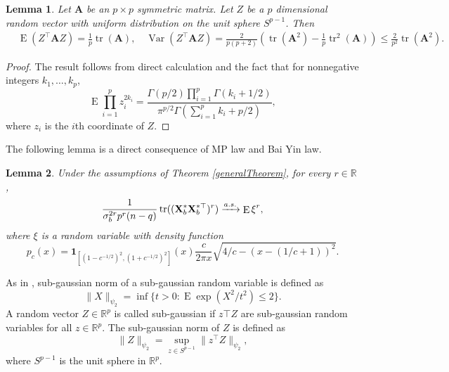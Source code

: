 \documentclass[11pt]{article}
\DeclareMathOperator{\mytr}{tr}
\DeclareMathOperator{\myE}{E}
\DeclareMathOperator{\myVar}{Var}
\newcommand{\BA}{\mathbf{A}}    \newcommand{\BB}{\mathbf{B}}    \newcommand{\BC}{\mathbf{C}}    \newcommand{\BD}{\mathbf{D}}    \newcommand{\BE}{\mathbf{E}}    \newcommand{\BF}{\mathbf{F}}    \newcommand{\BG}{\mathbf{G}}    \newcommand{\BH}{\mathbf{H}}    \newcommand{\BI}{\mathbf{I}}    \newcommand{\BJ}{\mathbf{J}}    \newcommand{\BK}{\mathbf{K}}    \newcommand{\BL}{\mathbf{L}}
\theoremstyle{plain}
\newtheorem{lemma}{\quad\quad Lemma}
\theoremstyle{definition}
\theoremstyle{remark}
\begin{document}
\begin{lemma}\label{lemma:uniform}
    Let $\BA$ be an $p\times p$ symmetric matrix.
    Let $Z$ be a $p$ dimensional random vector with uniform distribution on the unit sphere $ S^{p-1}$.
    Then 
    \begin{equation*}
        \begin{split}
            &\myE (Z^\top \BA Z) = \frac{1}{p} \mytr (\BA),
        \quad
        \myVar (Z^\top \BA Z) =
        \frac{2}{p(p+2)}\left( \mytr (\BA^2) - \frac{1}{p} \mytr^2 (\BA) \right)
        \leq
        \frac{2}{p^2} \mytr (\BA^2)  
        .
        \end{split}
    \end{equation*}
\end{lemma}
\begin{proof}
    The result follows from direct calculation and the fact that for nonnegative integers $k_1,\ldots, k_{p}$,
\begin{equation*}
    \myE \prod_{i=1}^p z_i^{2k_i} 
    =
    \frac{\Gamma(p/2) \prod_{i=1}^p \Gamma(k_i+1/2)}{ \pi^{p/2} \Gamma(\sum_{i=1}^p k_i + p/2)}
    ,
\end{equation*}
where $z_i$ is the $i$th coordinate of $Z$.
\end{proof}

The following lemma is a direct consequence of MP law and Bai Yin law.
\begin{lemma}\label{lemma:MP}
    Under the assumptions of Theorem \ref{generalTheorem}, for every $r\in \mathbb R$,
    \begin{equation*}
        \frac{1}{\sigma_b^{2r} p^r (n-q)}\mytr ((\BX_b^* \BX_b^{*\top})^{r} )
        \xrightarrow{a.s.}
        \myE \xi^r,
    \end{equation*}
    where $\xi$ is a random variable with density function
    \begin{equation*}
        p_{c}(x)=\mathbf{1}_{\left[(1-c^{-1/2})^2,(1+c^{-1/2})^2\right]}(x)
        \frac{c}{2\pi x} \sqrt{4/c - \left(x-(1/c+1)\right)^2}.
    \end{equation*}
\end{lemma}


As in \cite{Roman2018}, sub-gaussian norm of a sub-gaussian random variable is defined as
\begin{equation*}
    \|X\|_{\psi_2} = \inf \{t>0: \myE \exp(X^2/t^2) \leq 2\}.
\end{equation*}
A random vector $Z\in \mathbb R^p$ is called sub-gaussian if $z\top Z$ are sub-gaussian random variables for all $z\in \mathbb R^p$.
The sub-gaussian norm of $Z$ is defined as
\begin{equation*}
    \|Z\|_{\psi_2}= \sup_{z\in S^{p-1}} \|z^\top Z\|_{\psi_2},
\end{equation*}
where $S^{p-1}$ is the unit sphere in $\mathbb R^p$.
\end{document}
